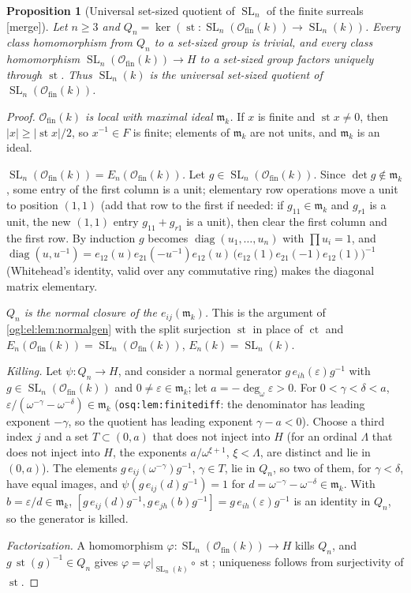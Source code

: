 \documentclass[11pt,oneside]{article}
\numberwithin{equation}{section}
\newtheorem{proposition}[proposition]{Proposition}
\theoremstyle{definition}
\theoremstyle{remark}
\newcommand{\Ofin}{\mathcal O_{\mathrm{fin}}}
\newcommand{\mm}{\mathfrak m}
\newcommand{\ct}{\operatorname{ct}}
\newcommand{\st}{\operatorname{st}}
\newcommand{\ddeg}{\operatorname{deg}_{\omega}}
\newcommand{\SL}{\operatorname{SL}}
\newcommand{\diag}{\operatorname{diag}}
\newcommand{\mergetag}{\textup{\textsf{\small[merge]}}}
\newcommand{\replabel}[1]{\nolinkurl{#1}}
\begin{document}
\begin{proposition}[Universal set-sized quotient of $\SL_n$ of the finite surreals \mergetag]\label{ogl:el:prop:finiteside}
Let $n\ge3$ and $Q_n=\ker(\st:\SL_n(\Ofin(k))\to\SL_n(k))$. Every class
homomorphism from $Q_n$ to a set-sized group is trivial, and every class
homomorphism $\SL_n(\Ofin(k))\to H$ to a set-sized group factors uniquely through
$\st$. Thus $\SL_n(k)$ is the universal set-sized quotient of $\SL_n(\Ofin(k))$.
\end{proposition}
\begin{proof}
\emph{$\Ofin(k)$ is local with maximal ideal $\mm_k$.} If $x$ is finite and
$\st x\ne0$, then $|x|\ge|\st x|/2$, so $x^{-1}\in F$ is finite; elements of
$\mm_k$ are not units, and $\mm_k$ is an ideal.

\emph{$\SL_n(\Ofin(k))=E_n(\Ofin(k))$.} Let $g\in\SL_n(\Ofin(k))$. Since
$\det g\notin\mm_k$, some entry of the first column is a unit; elementary row
operations move a unit to position $(1,1)$ (add that row to the first if needed:
if $g_{11}\in\mm_k$ and $g_{r1}$ is a unit, the new $(1,1)$ entry
$g_{11}+g_{r1}$ is a unit), then clear the first column and the first row. By
induction $g$ becomes $\diag(u_1,\dots,u_n)$ with $\prod u_i=1$, and
$\diag(u,u^{-1})=e_{12}(u)e_{21}(-u^{-1})e_{12}(u)\,
\bigl(e_{12}(1)e_{21}(-1)e_{12}(1)\bigr)^{-1}$ (Whitehead's identity, valid
over any commutative ring) makes the diagonal matrix elementary.

\emph{$Q_n$ is the normal closure of the $e_{ij}(\mm_k)$.} This is the argument
of \cref{ogl:el:lem:normalgen} with the split surjection $\st$ in place of
$\ct$ and $E_n(\Ofin(k))=\SL_n(\Ofin(k))$, $E_n(k)=\SL_n(k)$.

\emph{Killing.} Let $\psi:Q_n\to H$, and consider a normal generator
$g\,e_{ih}(\varepsilon)g^{-1}$ with $g\in\SL_n(\Ofin(k))$ and
$0\ne\varepsilon\in\mm_k$; let $a=-\ddeg\varepsilon>0$. For
$0<\gamma<\delta<a$, $\varepsilon/(\omega^{-\gamma}-\omega^{-\delta})\in\mm_k$
(\replabel{osq:lem:finitediff}: the denominator has leading exponent
$-\gamma$, so the quotient has leading exponent $\gamma-a<0$). Choose a third
index $j$ and a set $T\subset(0,a)$ that does not inject into $H$ (for an
ordinal $\Lambda$ that does not inject into $H$, the exponents
$a/\omega^{\xi+1}$, $\xi<\Lambda$, are distinct and lie in $(0,a)$).
The elements $g\,e_{ij}(\omega^{-\gamma})g^{-1}$, $\gamma\in T$, lie in $Q_n$, so
two of them, for $\gamma<\delta$, have equal images, and
$\psi(g\,e_{ij}(d)g^{-1})=1$ for $d=\omega^{-\gamma}-\omega^{-\delta}\in\mm_k$.
With $b=\varepsilon/d\in\mm_k$,
$[g\,e_{ij}(d)g^{-1},g\,e_{jh}(b)g^{-1}]=g\,e_{ih}(\varepsilon)g^{-1}$ is an
identity in $Q_n$, so the generator is killed.

\emph{Factorization.} A homomorphism $\varphi:\SL_n(\Ofin(k))\to H$ kills $Q_n$,
and $g\,\st(g)^{-1}\in Q_n$ gives $\varphi=\varphi|_{\SL_n(k)}\circ\st$;
uniqueness follows from surjectivity of $\st$.
\end{proof}
\end{document}
